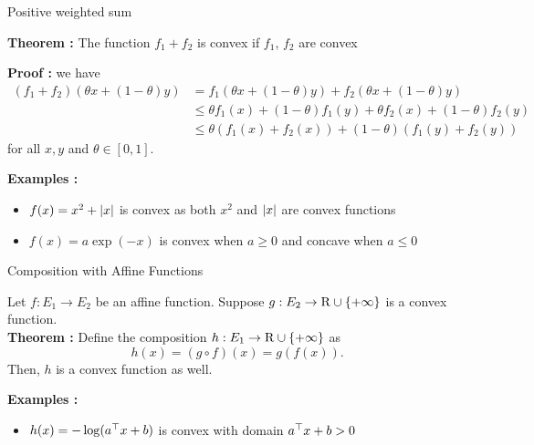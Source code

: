 \documentclass[9pt]{beamer}
\begin{document}
\begin{frame}{Positive weighted sum}

  \textbf{Theorem :} The function $f_1 + f_2$ is convex if $f_1$, $f_2$ are convex\\[1em]

  \vfill

  \textbf{Proof :} we have
  \begin{align*}
    (f_1+f_2)(\theta x + (1-\theta) y) &= f_1(\theta x + (1-\theta) y) + f_2(\theta x + (1-\theta) y)\\
                                       &\leq \theta f_1( x )+ (1-\theta) f_1(y) + \theta f_2( x )+ (1-\theta) f_2(y) \\
    & \leq \theta (f_1(x) + f_2(x)) + (1-\theta)(f_1(y) + f_2(y)) 
  \end{align*}
  for all $x, y$ and $\theta \in [0, 1]$.
  
  \vfill

  \textbf{Examples :}
  \begin{itemize}
  \item $f(x) = x^2 +\left|x\right|$ is convex as both $x^2$ and $\left|x\right|$ are convex functions
  \item $f(x) = a \exp(-x)$ is convex when $a\geq 0$ and concave when $a\leq 0$ 
  \end{itemize}
  
\end{frame}

\begin{frame}{Composition with Affine Functions}

  Let $f:E_1\to E_2$ be an affine function. Suppose $g:E_2\to\mathrm{R}\cup\{+\infty\}$ is a convex function.\\[1em]

  \textbf{Theorem : } Define the composition $h:E_1\to\mathrm{R}\cup\{+\infty\}$ as
  \[
    h(x) = (g \circ f)(x) = g(f(x)).
  \]
  Then, $h$ is a convex function as well.

  \vfill
  
  \textbf{Examples :}
  \begin{itemize}
  \item $h(x) = -\log(a^\top x + b)$ is convex with domain $a^\top x + b > 0$
  \end{itemize}

  
\end{frame}
\end{document}
